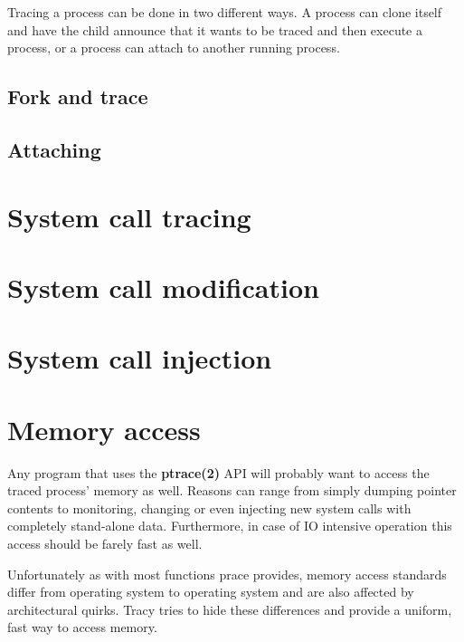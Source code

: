 \documentclass[a4paper, twoside, 10pt, twocolumn]{report}
\begin{document}
Tracing a process can be done in two different ways. A process can clone itself
and have the child announce that it wants to be traced and then execute a
process, or a process can attach to another running process.

\subsection{Fork and trace}

\subsection{Attaching}


\section{System call tracing}

\section{System call modification}

\section{System call injection}


\section{Memory access}

Any program that uses the \textbf{ptrace(2)} API will probably want to access the
traced process' memory as well. Reasons can range from simply dumping pointer
contents to monitoring, changing or even injecting new system calls with
completely stand-alone data. Furthermore, in case of IO intensive operation
this access should be farely fast as well.

Unfortunately as with most functions prace provides, memory access standards
differ from operating system to operating system and are also
affected by architectural quirks. Tracy tries to hide these differences and
provide a uniform, fast way to access memory.
\end{document}
